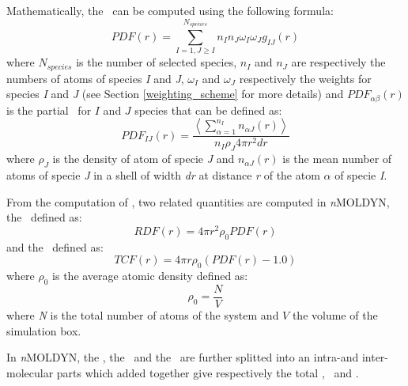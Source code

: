 \documentclass[a4paper,11pt]{report}
\newcommand{\NMOLDYN}{\textit{n}MOLDYN}
\begin{document}
Mathematically, the \PDF\ can be computed using the following formula:
\begin{equation}
PDF(r)=\sum_{I = 1,J\geq I}^{N_{species}}n_In_J \omega_I \omega_J g_{IJ}(r)
\end{equation}
where $N_{species}$ is the number of selected species, $n_I$ and $n_J$ are respectively the numbers of atoms of species 
\textit{I} and \textit{J}, $\omega_I$ and $\omega_J$ respectively the weights for species \textit{I} and \textit{J} 
(see Section \ref{weighting_scheme} for more details) and $PDF_{\alpha\beta}(r)$ is the partial \PDF\ for $I$ 
and $J$ species that can be defined as:
\begin{equation}
\label{eq:gij}
PDF_{IJ}(r) = \frac{\left\langle\sum_{\alpha = 1}^{n_I} n_{\alpha J}(r)\right\rangle}{n_I\rho_J 4\pi r^2dr}
\end{equation}
where $\rho_J$ is the density of atom of specie \textit{J} and $n_{\alpha J}(r)$ is the mean number of atoms of specie 
\textit{J} in a shell of width \textit{dr} at distance \textit{r} of the atom $\alpha$ of specie \textit{I}.

From the computation of \PDF , two related quantities are computed in \NMOLDYN, the \RDF\ defined as:
\begin{equation}
RDF(r) = 4 \pi r^2 \rho_0 PDF(r)
\end{equation}
and the \TCF\ defined as:
\begin{equation}
TCF(r) = 4\pi r \rho_0 (PDF(r) - 1.0)
\end{equation}
where $\rho_0$ is the average atomic density defined as:
\begin{equation}
\rho_0 = \frac{N}{V}
\end{equation}
where \textit{N} is the total number of atoms of the system and $V$ the volume of the simulation box.

In \NMOLDYN, the \PDF , the \RDF\ and the \TCF\ are further splitted into an intra-and inter-molecular parts 
which added together give respectively the total \PDF , \RDF\ and \TCF .
\end{document}
